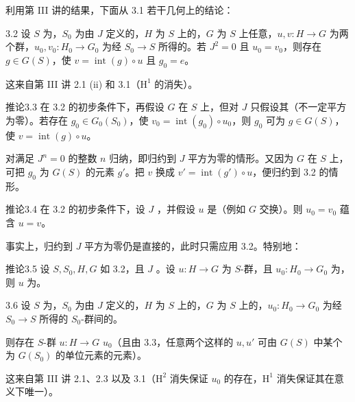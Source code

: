 利用第 III 讲的结果，下面从 3.1 若干几何上的结论：
\begin{SGAresult}{}{3.2}
设 $S$ 为，$S_0$ 为由 $J$ 定义的，$H$ 为 $S$ 上的，$G$ 为 $S$ 上任意，$u,v:H\to G$ 为两个群，$u_0,v_0:H_0\to G_0$ 为经 $S_0\to S$ 所得的。若 $J^2=0$ 且 $u_0=v_0$，则存在 $g\in G(S)$，使 $v=\operatorname{int}(g)\circ u$ 且 $g_0=e$。
\end{SGAresult}
这来自第 III 讲 2.1 (ii) 和 3.1（$\mathrm H^1$ 的消失）。
\begin{SGAresult}{推论}{3.3}
在 3.2 的初步条件下，再假设 $G$ 在 $S$ 上，但对 $J$ 只假设其（不一定平方为零）。若存在 $g_0\in G_0(S_0)$，使 $v_0=\operatorname{int}(g_0)\circ u_0$，则 $g_0$ 可为 $g\in G(S)$，使 $v=\operatorname{int}(g)\circ u$。
\end{SGAresult}
对满足 $J^n=0$ 的整数 $n$ 归纳，即归约到 $J$ 平方为零的情形。又因为 $G$ 在 $S$ 上，可把 $g_0$ 为 $G(S)$ 的元素 $g'$。把 $v$ 换成 $v'=\operatorname{int}(g')\circ u$，便归约到 3.2 的情形。
\begin{SGAresult}{推论}{3.4}
在 3.2 的初步条件下，设 $J$ ，并假设 $u$ 是（例如 $G$ 交换）。则 $u_0=v_0$ 蕴含 $u=v$。
\end{SGAresult}
事实上，归约到 $J$ 平方为零仍是直接的，此时只需应用 3.2。特别地：
\begin{SGAresult}{推论}{3.5}
设 $S,S_0,H,G$ 如 3.2，且 $J$ 。设 $u:H\to G$ 为 $S$-群，且 $u_0:H_0\to G_0$ 为，则 $u$ 为。
\end{SGAresult}
\begin{SGAresult}{}{3.6}
设 $S$ 为，$S_0$ 为由 $J$ 定义的，$H$ 为 $S$ 上的，$G$ 为 $S$ 上的，$u_0:H_0\to G_0$ 为经 $S_0\to S$ 所得的 $S_0$-群间的。

则存在 $S$-群 $u:H\to G$  $u_0$（且由 3.3，任意两个这样的 $u,u'$ 可由 $G(S)$ 中某个为 $G(S_0)$ 的单位元素的元素）。
\end{SGAresult}
这来自第 III 讲 2.1、2.3 以及 3.1（$\mathrm H^2$ 消失保证 $u_0$ 的存在，$\mathrm H^1$ 消失保证其在意义下唯一）。

